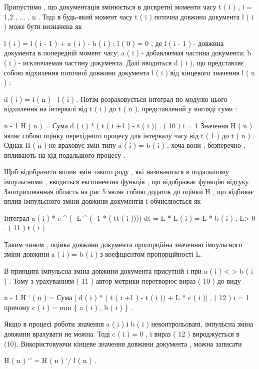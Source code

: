 \begin{description}
Припустимо , що документація змінюється в дискретні моменти часу t ( i ) , i = 1,2 , ... , n . Тоді в будь-який момент часу t ( i ) поточна довжина документа l ( i ) може бути визначена як

l ( i ) = l ( i - 1 ) + a ( i ) - b ( i ) ; l ( 0 ) = 0 ,
де l ( i - 1 ) - довжина документа в попередній момент часу; a ( i ) - добавляемая частина документа; b ( i ) - исключаемая частину документа.
Далі вводиться d ( i ), що представляє собою відхилення поточної довжини документа l ( i ) від кінцевого значення l ( n ) :

d ( i ) = l ( n ) - l ( i ) .
Потім розраховується інтеграл по модулю цього відхилення на інтервалі від t ( i ) до t ( n ), представлений у вигляді суми :

n - 1
H ( n ) = Сума \textbar{} d ( i ) \textbar{} * ( t ( i +1 ) - t ( i )) . ( 10 )
i = 1
Значення H ( n ) являє собою оцінку перехідного процесу для інтервалу часу від t ( 1 ) до t ( n ) . Однак H ( n ) не враховує змін типу a ( i ) = b ( i ) , хоча вони , безперечно , впливають на хід подальшого процесу .

Щоб відобразити вплив змін такого роду , які називаються в подальшому імпульсними , вводиться експонентна функція , що відображає функцію відгуку. Заштрихованная область на рис.5 являє собою додаток до оцінки H , що відбиває вплив імпульсного зміни довжини документів і обчислюється як

Інтеграл a ( i ) * e \textasciicircum{} ( -L \textasciicircum{} ( -1 * ( tt ( i )))) dt = L * L ( i ) = L * b ( i ) , L\textgreater{} 0 . ( 11 )
t ( i )

Таким чином , оцінка довжини документа пропорційна значенню імпульсного зміни довжини a ( i ) = b ( i ) з коефіцієнтом пропорційності L.

В принципі імпульсна зміна довжини документа присутній і при a ( i ) \textless{} \textgreater{} b ( i ) . Тому з урахуванням ( 11 ) автор метрики перетворює вираз ( 10 ) до виду

n - 1
H ` ( n ) = Сума {[} \textbar{} d ( i ) \textbar{} * ( t ( i +1 ) - t ( i )) + L * c ( i ){]} , ( 12 )
i = 1
причому c ( i ) = min \{ a ( i ) , b ( i ) \} .

Якщо в процесі роботи значення a ( i ) і b ( i ) неконтрольовані, імпульсна зміна довжини врахувати не можна. Тоді c ( i ) = 0 , і вираз ( 12 ) вироджується в (10). Використовуючи кінцеве значення довжини документа , можна записати

H ( n ) `' = H ( n ) `/ l ( n ) .

\end{description}


